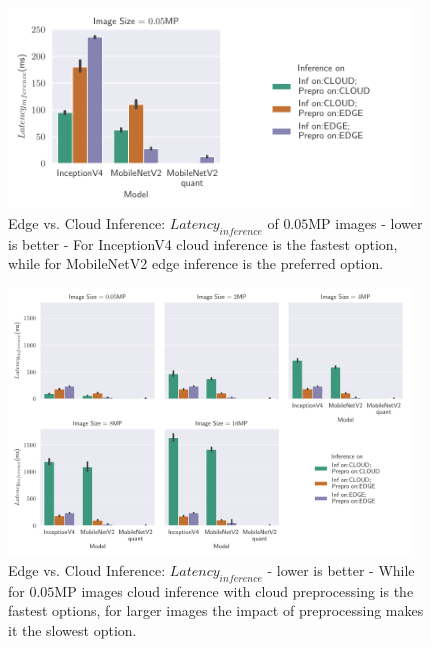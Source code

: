\begin{figure}[!htb]
\centering
\includegraphics[width=0.95\textwidth]{./Bilder/single_plots/edge_vs_cloud_plots/Edge_vs_Cloud_Inference_Inference_Latencies_onlyNR.pdf}
\caption[Edge vs. Cloud Inference:  $Latency_{inference}$ of $0.05$MP images - lower is better]{Edge vs. Cloud Inference:  $Latency_{inference}$ of $0.05$MP images - lower is better - For InceptionV4 cloud inference is the fastest option, while for MobileNetV2 edge inference is the preferred option.}
\label{fig:EdgeVsCloudInferenceLatNR}
\end{figure}
\begin{figure}[!htb]
\centering
\includegraphics[width=0.95\textwidth]{./Bilder/single_plots/edge_vs_cloud_plots/Edge_vs_Cloud_Inference_Inference_Latencies.pdf}
\caption[Edge vs. Cloud Inference:  $Latency_{inference}$ - lower is better]{Edge vs. Cloud Inference:  $Latency_{inference}$ - lower is better -
While for $0.05$MP images cloud inference with cloud preprocessing is the fastest options, for larger images the impact of preprocessing makes it the slowest option.}
\label{fig:EdgeVsCloudInferenceLat}
\end{figure}


